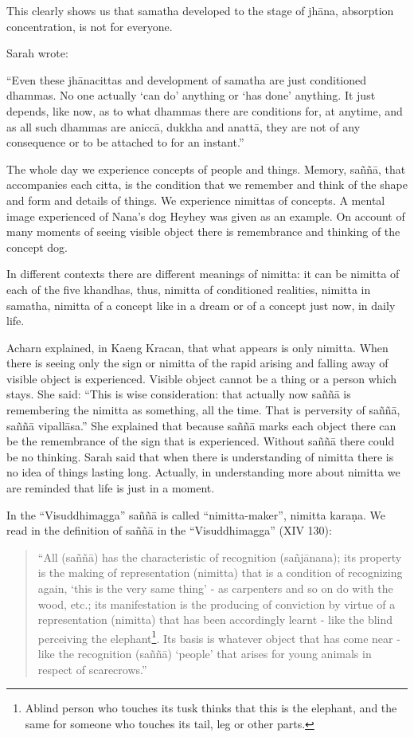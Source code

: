 \documentclass{book}
\begin{document}
This clearly shows us that samatha developed
to the stage of jhāna, absorption concentration, is not for everyone. 

Sarah wrote:

``Even these
jhānacittas and development of
samatha are just conditioned dhammas. No one actually
`can
do' anything or
`has
done' anything. It just
depends, like now, as to what dhammas there are conditions
for, at
anytime, and as all such
dhammas are aniccā, dukkha and
anattā, they are not of any
consequence or to be attached to for an instant.''

The whole day we experience concepts of people and things.
Memory, saññā, that accompanies each citta, is the condition that we
remember and think of the shape and form and details of things. We
experience nimittas of concepts. A mental image experienced of Nana's
dog Heyhey was given as an example. On account of many moments of seeing
visible object there is remembrance and thinking of the concept dog. 

In different contexts there are different meanings of
nimitta: it can be nimitta of each of the five khandhas, thus, nimitta
of conditioned realities, nimitta in samatha, nimitta of a concept like
in a dream or of a concept just now, in daily life. 

Acharn explained, in Kaeng Kracan, that what appears is only
nimitta. When there is seeing only the sign or nimitta of the rapid
arising and falling away of visible object is experienced. Visible
object cannot be a thing or a person which stays. She said: ``This is
wise consideration: that actually now saññā is remembering the nimitta
as something, all the time. That is perversity of saññā, saññā
vipallāsa.'' She explained that because saññā marks each object there
can be the remembrance of the sign that is experienced. Without saññā
there could be no thinking. Sarah said that when there is understanding
of nimitta there is no idea of things lasting long. Actually, in
understanding more about nimitta we are reminded that life is just in a
moment. 

In the ``Visuddhimagga'' saññā is called ``nimitta-maker'',
nimitta karaṇa. We read in the definition of saññā in the
``Visuddhimagga'' (XIV 130): 

\begin{quote}

``All
(saññā) has the
characteristic of recognition
(sañjānana); its
property is the making of representation (nimitta) that is a condition
of recognizing again, `this is the very same thing' - as carpenters and
so on do with the wood, etc.; its manifestation is the producing of
conviction by virtue of a representation (nimitta) that has been
accordingly learnt - like the blind perceiving the
elephant\footnote{Ablind person who touches its tusk thinks that this is the elephant,  and
the same for someone who touches its tail, leg or other parts.}.
Its basis is whatever object that has come near - like the recognition
(saññā) `people' that arises
for young animals in respect of scarecrows.''
\end{quote}
\end{document}
